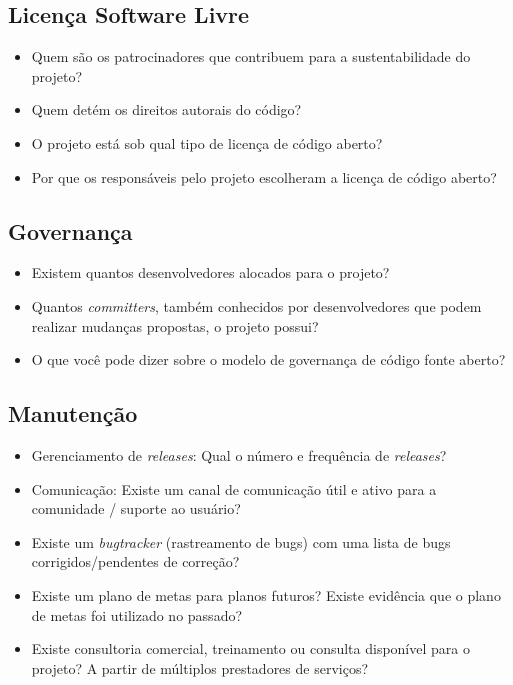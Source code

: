 \documentclass[12pt,a4paper]{article} %
\begin{document}
\subsection{Licença Software Livre}


\begin{itemize}
\item Quem são os patrocinadores que contribuem para a sustentabilidade do projeto?
\item Quem detém os direitos autorais do código?
\item O projeto está sob qual tipo de licença de código aberto?
\item Por que os responsáveis pelo projeto escolheram a licença de código aberto?
\end{itemize}

\subsection{Governança}


\begin{itemize}
\item Existem quantos desenvolvedores alocados para o projeto?
\item Quantos \textit{committers}, também conhecidos por desenvolvedores que podem realizar mudanças propostas, o projeto possui?
\item O que você pode dizer sobre o modelo de governança de código fonte aberto?
\end{itemize}

\subsection{Manutenção}


\begin{itemize}
\item Gerenciamento de \textit{releases}: Qual o número e frequência de \textit{releases}?
\item Comunicação: Existe um canal de comunicação útil e ativo para a comunidade / suporte ao usuário?
\item Existe um \textit{bugtracker} (rastreamento de bugs) com uma lista de bugs corrigidos/pendentes de correção?
\item Existe um plano de metas para planos futuros? Existe evidência que o plano de metas foi utilizado no passado?
\item Existe consultoria comercial, treinamento ou consulta disponível para o projeto? A partir de múltiplos prestadores de serviços?         
\end{itemize}
        

\par\vspace{\baselineskip}

\end{document}
